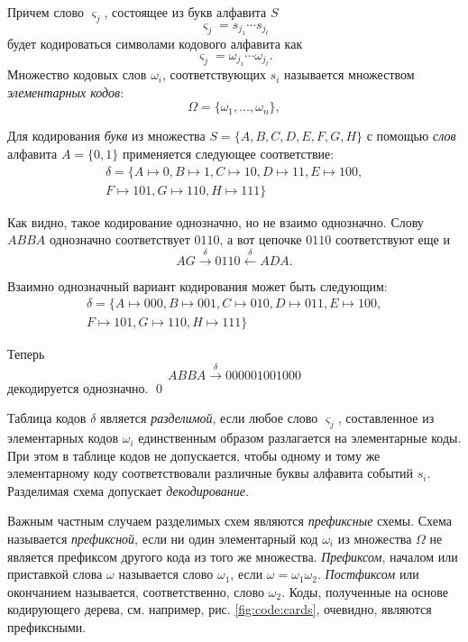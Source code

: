 Причем слово $\varsigma_j$, состоящее из букв алфавита $S$
\[
    \varsigma_j=s_{j_1}\cdots s_{j_t}
\]
будет кодироваться символами кодового алфавита как
\[
    \varsigma_j=\omega_{j_1} \cdots \omega_{j_t}.
\]
Множество кодовых слов $\omega_i$, соответствующих $s_i$ называется множеством \emph{элементарных кодов}:
\[
\Omega=\{\omega_1,\ldots,\omega_n\},
\]

\begin{exampl}
    Для кодирования \emph{букв} из множества $S=\{A,B,C,D,E,F,G,H\}$ с помощью \emph{слов} алфавита $A=\{0,1\}$ применяется следующее соответствие:
    \[
    \begin{split}
        \delta=\{ 
            A \mapsto 0,
            B \mapsto 1,
            C \mapsto 10,
            D \mapsto 11,
            E \mapsto 100,\\
            F \mapsto 101,
            G \mapsto 110,
            H \mapsto 111
        \}
    \end{split}
    \]

    Как видно, такое кодирование однозначно, но не взаимо однозначно. Слову $ABBA$ однозначно соответствует $0110$, а вот цепочке $0110$ соответствуют еще и
    \[AG\xrightarrow{\delta} 0110 \xleftarrow{\delta} ADA.\]

    Взаимно однозначный вариант кодирования может быть следующим:
    \[
        \begin{split}
            \delta=\{ 
                A \mapsto 000,
                B \mapsto 001,
                C \mapsto 010,
                D \mapsto 011,
                E \mapsto 100,\\
                F \mapsto 101,
                G \mapsto 110,
                H \mapsto 111
            \}
        \end{split}
    \]

    Теперь
    \[ABBA\xrightarrow{\delta} 000001001000\]
    декодируется однозначно.
    \qed
\end{exampl}

Таблица кодов $\delta$ является \emph{разделимой}, если любое слово $\varsigma_j$, составленное из элементарных кодов $\omega_i$ единственным образом разлагается на элементарные коды. При этом в таблице кодов не допускается, чтобы одному и тому же элементарному коду соответствовали различные буквы алфавита событий $s_i$.  Разделимая схема допускает \emph{декодирование}.

Важным частным случаем разделимых схем являются \emph{префиксные} схемы. Схема называется \emph{префиксной}, если ни один элементарный код $\omega_i$  из множества $\Omega$ не является префиксом другого кода из того же множества. \emph{Префиксом}, началом или приставкой слова $\omega$ называется слово $\omega_1$, если $\omega=\omega_1 \omega_2$. \emph{Постфиксом} или окончанием называется, соответственно, слово $\omega_2$. Коды, полученные на основе кодирующего дерева, см. например, рис. \ref{fig:code:cards}, очевидно, являются префиксными.

